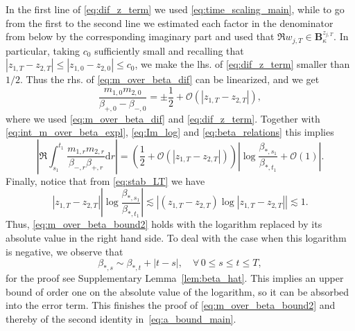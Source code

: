 \documentclass[10pt]{amsart}
\numberwithin{equation}{section}
\newcommand{\dif}{\mathrm{d}}
\begin{document}
In the first line of \eqref{eq:dif_z_term} we used \eqref{eq:time_scaling_main}, while to go from the first to the second line we estimated each factor in the denominator from below by the corresponding imaginary part and used that $\Re w_{j,T}\in\mathbf{B}_\kappa^{z_{j,T}}$. In particular, taking $c_0$ sufficiently small and recalling that $|z_{1,T}-z_{2,T}|\le |z_{1,0}-z_{2,0}|\le c_0$, we make the lhs. of \eqref{eq:dif_z_term} smaller than $1/2$. Thus the rhs. of \eqref{eq:m_over_beta_dif} can be linearized, and we get
\begin{equation}
\frac{m_{1,0}m_{2,0}}{\beta_{+,0}-\beta_{-,0}} = \pm \frac{1}{2} + \mathcal{O}(|z_{1,T}-z_{2,T}|),
\end{equation}
where we used \eqref{eq:m_over_beta_dif} and \eqref{eq:dif_z_term}. Together with \eqref{eq:int_m_over_beta_expl}, \eqref{eq:Im_log} and \eqref{eq:beta_relations} this implies
\begin{equation}
\left\vert \Re\int_{s_1}^{t_1} \frac{m_{1,r}m_{2,r}}{\beta_{-,r}\beta_{+,r}}\dif r\right\vert = \left(\frac{1}{2} + \mathcal{O}(|z_{1,T}-z_{2,T}|)\right) \left\vert \log \frac{\beta_{*,s_1}}{\beta_{*,t_1}} + \mathcal{O}(1) \right\vert.
\label{eq:a_bound_prefin}
\end{equation}
Finally, notice that from \eqref{eq:stab_LT} we have
\begin{equation*}
|z_{1,T}-z_{2,T}|\left\vert \log \frac{\beta_{*,s_1}}{\beta_{*,t_1}}\right\vert \lesssim \left\vert(z_{1,T}-z_{2,T})\log |z_{1,T}-z_{2,T}|\right\vert \lesssim 1.
\end{equation*}
Thus, \eqref{eq:m_over_beta_bound2} holds with the logarithm replaced by its absolute value in the right hand side. To deal with the case when this logarithm is negative, we observe that
\begin{equation}
\beta_{*,s}\sim \beta_{*,t}+|t-s|,\quad \forall \, 0\le s\le t\le T,
\label{eq:gamma_monot_main}
\end{equation}
for the proof see Supplementary Lemma~\ref{lem:beta_hat}. This implies an upper bound of order one on the absolute value of the logarithm, so it can be absorbed into the error term. This finishes the proof of \eqref{eq:m_over_beta_bound2} and thereby of the second identity in~\eqref{eq:a_bound_main}.
\end{document}
